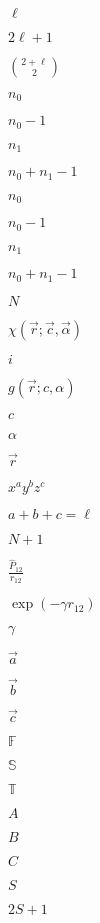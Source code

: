 \documentclass{article}
\begin{document}
$\ell$
\pagebreak

$2\ell + 1$
\pagebreak

$\binom{2 + \ell}{2}$
\pagebreak

$n_0$
\pagebreak

$n_0 -1$
\pagebreak

$n_1$
\pagebreak

$n_0 + n_1 - 1$
\pagebreak

$n_{0}$
\pagebreak

$n_{0} -1$
\pagebreak

$n_{1}$
\pagebreak

$n_0 + n_1 -1$
\pagebreak

$N$
\pagebreak

$\chi(\vec{r};\vec{c}, \vec{\alpha})$
\pagebreak

$i$
\pagebreak

$g(\vec{r};c, \alpha)$
\pagebreak

$c$
\pagebreak

$\alpha$
\pagebreak

$\vec{r}$
\pagebreak

$x^ay^bz^c$
\pagebreak

$a+b+c = \ell$
\pagebreak

$N+1$
\pagebreak

$\frac{\widehat{P}_{12}}{r_{12}}$
\pagebreak

$\exp(-\gamma r_{12})$
\pagebreak

$\gamma$
\pagebreak

$\vec{a}$
\pagebreak

$\vec{b}$
\pagebreak

$\vec{c}$
\pagebreak

$\mathbb{F}$
\pagebreak

$\mathbb{S}$
\pagebreak

$\mathbb{T}$
\pagebreak

$A$
\pagebreak

$B$
\pagebreak

$C$
\pagebreak

$S$
\pagebreak

$2S + 1$
\pagebreak
\end{document}
